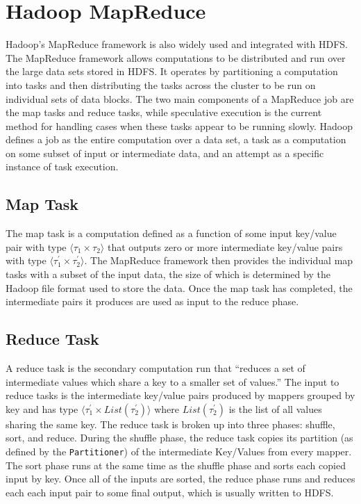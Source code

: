 \documentclass{ucetd}
\newcommand{\code}[1]{\texttt{#1}}
\begin{document}
\section{Hadoop MapReduce}

Hadoop's MapReduce framework is also widely used and integrated with HDFS. The
MapReduce framework allows computations to be distributed and run over the large
data sets stored in HDFS.  It operates by partitioning a computation into tasks
and then distributing the tasks across the cluster to be run on individual sets
of data blocks. The two main components of a MapReduce job are the map tasks and
reduce tasks, while speculative execution is the current method for handling
cases when these tasks appear to be running slowly. Hadoop defines a job as the
entire computation over a data set, a task as a computation on some subset of
input or intermediate data, and an attempt as a specific instance of task
execution.

    \subsection{Map Task}

The map task is a computation defined as a function of some input key/value pair
with type $\langle \tau_1 \times \tau_2 \rangle$ that outputs zero or more
intermediate key/value pairs with type $\langle \tau_1^{\prime} \times
\tau_2^{\prime} \rangle$. The MapReduce framework then provides the individual
map tasks with a subset of the input data, the size of which is determined by
the Hadoop file format used to store the data. Once the map task has completed,
the intermediate pairs it produces are used as input to the reduce phase.

    \subsection{Reduce Task}

A reduce task is the secondary computation run that ``reduces a set of
intermediate values which share a key to a smaller set of values.''
\cite{Reducer} The input to reduce tasks is the intermediate key/value pairs
produced by mappers grouped by key and has type $\langle \tau_1^{\prime} \times
List(\tau_2^{\prime}) \rangle$ where $List(\tau_2^{\prime})$ is the list of all
values sharing the same key.  The reduce task is broken up into three phases:
shuffle, sort, and reduce.  During the shuffle phase, the reduce task copies its
partition (as defined by the \code{Partitioner}) of the intermediate Key/Values
from every mapper. The sort phase runs at the same time as the shuffle phase and
sorts each copied input by key. Once all of the inputs are sorted, the reduce
phase runs and reduces each each input pair to some final output, which is
usually written to HDFS.
\end{document}
